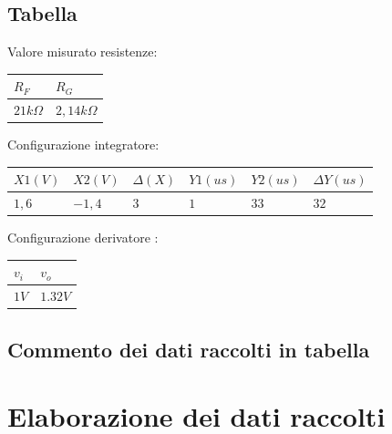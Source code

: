 \documentclass[12pt]{article}
\begin{document}
\subsection{Tabella}
Valore misurato resistenze:\\
\begin{center}
        \begin{tabular}{|p{2cm}|p{2cm}|}
            \hline
            \rowcolor{Green} $R_F$ & $R_G$ \\
            \hline
            \rowcolor{LimeGreen} $21k\Omega$ & $2,14k\Omega$  \\ 
            \hline
        \end{tabular}
        \label{Valore resistenze}
\end{center}
\noindent
Configurazione integratore:\\
\begin{center}
    \begin{tabular}{|p{2cm} |p{2cm}|p{2cm} |p{2cm}|p{2cm} |p{2cm}|}
        \hline
        \rowcolor{Green} $X1(V)$ & $X2(V)$& $\Delta (X)$ & $Y1(us)$ & $Y2(us)$ & $\Delta Y(us)$   \\
        \hline
        \rowcolor{LimeGreen} $1,6$ & $-1,4$ & $3$ & $1$ & $33$  & $32$\\ 
        \hline
    \end{tabular}
\end{center}

\noindent Configurazione derivatore :\\
\begin{center}
    \begin{tabular}{|p{2cm} |p{2cm}|}
        \hline
        \rowcolor{Green} $v_i$ & $v_o$  \\
        \hline
        \rowcolor{LimeGreen} $1V$ & $1.32V$  \\ 
        \hline
    \end{tabular}
    \label{Valore resistenze}
\end{center}

\subsection{Commento dei dati raccolti in tabella}

\section{Elaborazione dei dati raccolti}
\end{document}
